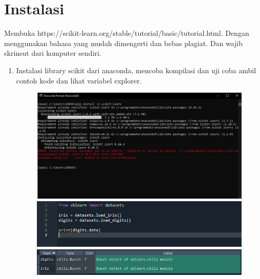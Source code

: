 \section{Instalasi}
Membuka https://scikit-learn.org/stable/tutorial/basic/tutorial.html. Dengan menggunakan bahasa yang mudah dimengerti dan bebas plagiat. 
Dan wajib skrinsut dari komputer sendiri.
\begin{enumerate}
\item
Instalasi library scikit dari anaconda, mencoba kompilasi dan uji coba ambil contoh kode dan lihat variabel explorer.
		\begin{figure}[!htbp]
			\centering
			\includegraphics[scale=0.3]{figures/1.1.PNG}
			\includegraphics[scale=0.5]{figures/1.2.PNG}
			\includegraphics[scale=0.4]{figures/1.3.PNG}
		\end{figure}
	

\end{enumerate}
